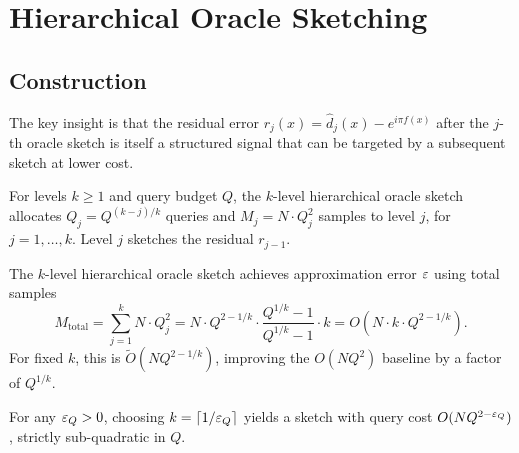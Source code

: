 \section{Hierarchical Oracle Sketching}
\label{sec:hier}

\subsection{Construction}

The key insight is that the residual error $r_j(x) = \hat{d}_{j}(x) - e^{i\pi f(x)}$ after the $j$-th oracle sketch is itself a structured signal that can be targeted by a subsequent sketch at lower cost.

\begin{definition}
For levels $k\geq 1$ and query budget $Q$, the $k$-level hierarchical oracle sketch allocates $Q_j = Q^{(k-j)/k}$ queries and $M_j = N\cdot Q_j^2$ samples to level $j$, for $j=1,\ldots,k$.  Level $j$ sketches the residual $r_{j-1}$.
\end{definition}

\begin{theorem}\label{thm:hier}
The $k$-level hierarchical oracle sketch achieves approximation error $\varepsilon$ using total samples
\[
  M_{\mathrm{total}} = \sum_{j=1}^k N\cdot Q_j^2 = N\cdot Q^{2-1/k}\cdot\frac{Q^{1/k}-1}{Q^{1/k}-1}\cdot k = O(N\cdot k\cdot Q^{2-1/k}).
\]
For fixed $k$, this is $\widetilde{O}(NQ^{2-1/k})$, improving the $O(NQ^2)$ baseline by a factor of $Q^{1/k}$.
\end{theorem}

\begin{corollary}\label{cor:hier}
For any $\varepsilon_Q > 0$, choosing $k = \lceil 1/\varepsilon_Q\rceil$ yields a sketch with query cost $O(NQ^{2-\varepsilon_Q})$, strictly sub-quadratic in $Q$.
\end{corollary}

